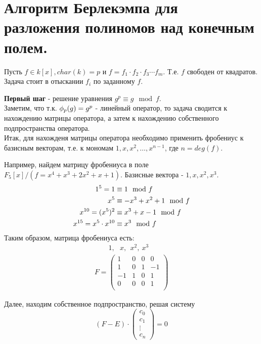 \section{Алгоритм Берлекэмпа для разложения полиномов над конечным полем.}

Пусть $f \in k[x], char(k) = p$ и $f = f_1 \cdot f_2 \cdot f_3 \cdots f_m$. Т.е. $f$ свободен от квадратов. \\
Задача стоит в отыскании $f_i$ по заданному $f$.

\textbf{Первый шаг} - решение уравнения $g^p \equiv g \mod f$.\\
Заметим, что т.к. $\phi_{p}(g) = g^p$ - линейный оператор, то задача сводится к нахождению матрицы оператора, а затем к
нахождению собственного подпространства оператора. \\
Итак, для нахожденя матрицы оператора необходимо применить фробениус к базисным векторам, т.е. к мономам $1, x, x^2,
\dots, x^{n - 1}$, где $n = deg(f)$.

Например, найдем матрицу фробениуса в поле $F_5[x] / (f = x^4+x^3+2x^2+x+1)$. Базисные вектора - $1, x, x^2, x^3$.
\begin{align}
1^5 = 1 &\equiv 1 \mod f \notag \\
x^5 &\equiv -x^3 + x^2 + 1 \mod f \notag \\
x^{10} = (x^5)^2 &\equiv x^3 + x - 1 \mod f \notag \\
x^{15} = x^5 \cdot x^{10} &\equiv x^3 \mod f \notag 
\end{align}
Таким образом, матрица фробениуса есть:
\[
\begin{array}{l}
~~~~~~~~~1,~~~x,~~x^2,~x^3 \\
F = 
\begin{pmatrix}
1 & 0 & 0 & 0 \\
1 & 0 & 1 & -1 \\
-1 & 1 & 0 & 1 \\
0 & 0 & 0 & 1 \\ 
\end{pmatrix}
\end{array}
\]

Далее, находим собственное подпространство, решая систему 
\[(F - E) \cdot \begin{pmatrix} c_0 \\ c_1\\ \vdots \\ c_n \end{pmatrix} = 0\]

